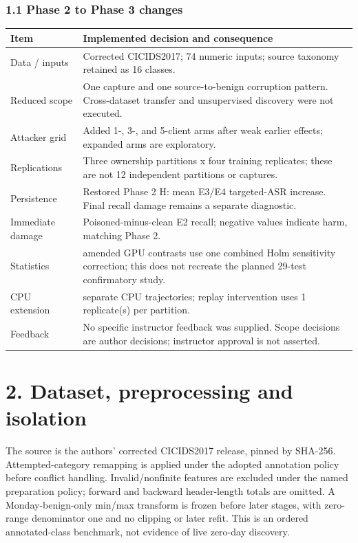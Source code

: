 \documentclass[
  10pt,
]{article}
\begin{document}
\hypertarget{phase-2-to-phase-3-changes}{%
\subsubsection{1.1 Phase 2 to Phase 3
changes}\label{phase-2-to-phase-3-changes}}

\begin{longtable}[]{@{}
  >{\raggedright\arraybackslash}p{}
  >{\raggedright\arraybackslash}p{}@{}}
\toprule
Item & Implemented decision and consequence \\
\midrule
\endhead
Data / inputs & Corrected CICIDS2017; 74 numeric inputs; source taxonomy
retained as 16 classes. \\
Reduced scope & One capture and one source-to-benign corruption pattern.
Cross-dataset transfer and unsupervised discovery were not executed. \\
Attacker grid & Added 1-, 3-, and 5-client arms after weak earlier
effects; expanded arms are exploratory. \\
Replications & Three ownership partitions x four training replicates;
these are not 12 independent partitions or captures. \\
Persistence & Restored Phase 2 H: mean E3/E4 targeted-ASR increase.
Final recall damage remains a separate diagnostic. \\
Immediate damage & Poisoned-minus-clean E2 recall; negative values
indicate harm, matching Phase 2. \\
Statistics & 47 amended GPU contrasts use one combined Holm sensitivity
correction; this does not recreate the planned 29-test confirmatory
study. \\
CPU extension & 21 separate CPU trajectories; replay intervention uses 1
replicate(s) per partition. \\
Feedback & No specific instructor feedback was supplied. Scope decisions
are author decisions; instructor approval is not asserted. \\
\bottomrule
\end{longtable}

\hypertarget{dataset-preprocessing-and-isolation}{%
\section{2. Dataset, preprocessing and
isolation}\label{dataset-preprocessing-and-isolation}}

The source is the authors' corrected CICIDS2017 release, pinned by
SHA-256. Attempted-category remapping is applied under the adopted
annotation policy before conflict handling. Invalid/nonfinite features
are excluded under the named preparation policy; forward and backward
header-length totals are omitted. A Monday-benign-only min/max transform
is frozen before later stages, with zero-range denominator one and no
clipping or later refit. This is an ordered annotated-class benchmark,
not evidence of live zero-day discovery.
\end{document}

